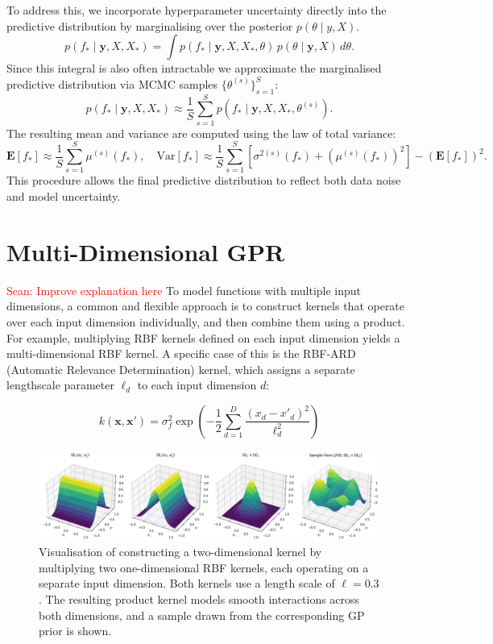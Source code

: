 \documentclass[10pt]{article}
\newcommand{\Sean}[1]{{\textcolor{red}{{Sean: #1}} }}
\begin{document}
To address this, we incorporate hyperparameter uncertainty directly into the predictive distribution by marginalising over the posterior \( p(\theta \mid y, X) \).
%
\begin{equation}
p(f_* \mid \mathbf{y}, X, X_*) = \int p(f_* \mid \mathbf{y}, X, X_*, \theta) \, p(\theta \mid \mathbf{y}, X) \, d\theta.
\end{equation}
Since this integral is also often intractable we approximate the marginalised predictive distribution via MCMC samples \( \{\theta^{(s)}\}_{s=1}^S \):
%
\begin{equation}
p(f_* \mid \mathbf{y}, X, X_*) \approx \frac{1}{S} \sum_{s=1}^{S} p(f_* \mid \mathbf{y}, X, X_*, \theta^{(s)}).
\end{equation}
%
The resulting mean and variance are computed using the law of total variance:
%
\begin{equation}
\mathbf{E}[f_*] \approx \frac{1}{S} \sum_{s=1}^{S} \mu^{(s)}(f_*), \quad
\text{Var}[f_*] \approx \frac{1}{S} \sum_{s=1}^{S} \left[ \sigma^{2(s)}(f_*) + \left(\mu^{(s)}(f_*)\right)^2 \right] - \left( \mathbf{E}[f_*] \right)^2.
\end{equation}
This procedure allows the final predictive distribution to reflect both data noise and model uncertainty.


\section{Multi-Dimensional GPR}
\Sean{Improve explanation here}
To model functions with multiple input dimensions, a common and flexible approach is to construct kernels that operate over each input dimension individually, 
and then combine them using a product. For example, multiplying RBF kernels defined on each input dimension yields a multi-dimensional RBF kernel.
A specific case of this is the RBF-ARD (Automatic Relevance Determination) kernel, which assigns a separate lengthscale parameter \( \ell_d \) to each input dimension \( d \):

\[
k(\mathbf{x}, \mathbf{x}') = \sigma_f^2 \exp\left( -\frac{1}{2} \sum_{d=1}^D \frac{(x_d - x'_d)^2}{\ell_d^2} \right)
\]

\begin{figure}[H]
    \centering
    \includegraphics[width=\textwidth]{LatexPlots/final_gps_plots/2dkernels.png}
    \caption{
    Visualisation of constructing a two-dimensional kernel by multiplying two one-dimensional RBF kernels, each operating on a separate input dimension. Both kernels use a length scale of \(\ell = 0.3\). 
    The resulting product kernel models smooth interactions across both dimensions, and a sample drawn from the corresponding GP prior is shown.}
    \label{fig:2dkernels}
\end{figure}
\end{document}
